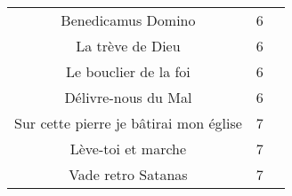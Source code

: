 \begin{center}
\begin{supertabular}{|c|c|c|}
Benedicamus Domino & 6 & \cite[p.244]{MC} \\
La trève de Dieu & 6 & \cite[p.244]{MC} \\ 
Le bouclier de la foi & 6 & \cite[p.244]{MC} \\ 
Délivre-nous du Mal & 6 & \cite[p.244]{MC} \\
Sur cette pierre je bâtirai mon église & 7 & \cite[p.244]{MC} \\
Lève-toi et marche & 7 & \cite[p.244]{MC} \\ 
Vade retro Satanas & 7 & \cite[p.244]{MC} \\ 

\end{supertabular}
\end{center}

